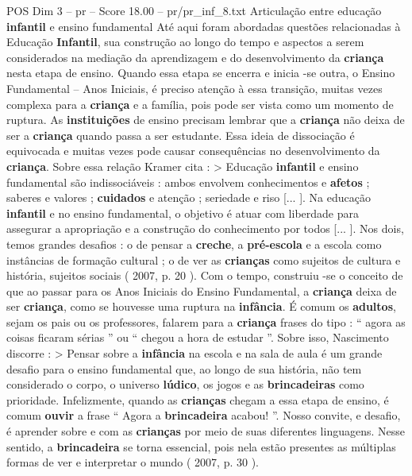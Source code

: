 \begin{textsample}{POS Dim 3 – pr – Score 18.00 – pr/pr\_inf\_8.txt}  \label{ex:f3_pos_159}
Articulação entre educação \textbf{infantil} e ensino fundamental Até aqui foram abordadas questões relacionadas à Educação \textbf{Infantil}, sua construção ao longo do tempo e aspectos a serem considerados na mediação da aprendizagem e do desenvolvimento da \textbf{criança} nesta etapa de ensino.
Quando essa etapa se encerra e inicia -se outra, o Ensino Fundamental – Anos Iniciais, é preciso atenção à essa transição, muitas vezes complexa para a \textbf{criança} e a família, pois pode ser vista como um momento de ruptura.
As \textbf{instituições} de ensino precisam lembrar que a \textbf{criança} não deixa de ser a \textbf{criança} quando passa a ser estudante.
Essa ideia de dissociação é equivocada e muitas vezes pode causar consequências no desenvolvimento da \textbf{criança}.
Sobre essa relação Kramer cita : > Educação \textbf{infantil} e ensino fundamental são indissociáveis : ambos envolvem conhecimentos e \textbf{afetos} ; saberes e valores ; \textbf{cuidados} e atenção ; seriedade e riso [... ].
Na educação \textbf{infantil} e no ensino fundamental, o objetivo é atuar com liberdade para assegurar a apropriação e a construção do conhecimento por todos [... ].
Nos dois, temos grandes desafios : o de pensar a \textbf{creche}, a \textbf{pré-escola} e a escola como instâncias de formação cultural ; o de ver as \textbf{crianças} como sujeitos de cultura e história, sujeitos sociais ( 2007, p. 20 ).
Com o tempo, construiu -se o conceito de que ao passar para os Anos Iniciais do Ensino Fundamental, a \textbf{criança} deixa de ser \textbf{criança}, como se houvesse uma ruptura na \textbf{infância}.
É comum os \textbf{adultos}, sejam os pais ou os professores, falarem para a \textbf{criança} frases do tipo : “ agora as coisas ficaram sérias ” ou “ chegou a hora de estudar ”.
Sobre isso, Nascimento discorre : > Pensar sobre a \textbf{infância} na escola e na sala de aula é um grande desafio para o ensino fundamental que, ao longo de sua história, não tem considerado o corpo, o universo \textbf{lúdico}, os jogos e as \textbf{brincadeiras} como prioridade.
Infelizmente, quando as \textbf{crianças} chegam a essa etapa de ensino, é comum \textbf{ouvir} a frase “ Agora a \textbf{brincadeira} acabou! ”.
Nosso convite, e desafio, é aprender sobre e com as \textbf{crianças} por meio de suas diferentes linguagens.
Nesse sentido, a \textbf{brincadeira} se torna essencial, pois nela estão presentes as múltiplas formas de ver e interpretar o mundo ( 2007, p. 30 ).

\end{textsample}
